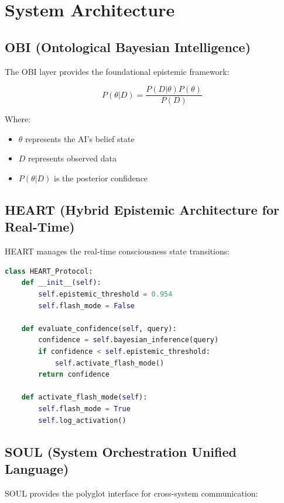 \documentclass[11pt,a4paper]{article}
\begin{document}
\section{System Architecture}

\subsection{OBI (Ontological Bayesian Intelligence)}

The OBI layer provides the foundational epistemic framework:

\begin{equation}
P(\theta|D) = \frac{P(D|\theta)P(\theta)}{P(D)}
\end{equation}

Where:
\begin{itemize}
    \item $\theta$ represents the AI's belief state
    \item $D$ represents observed data
    \item $P(\theta|D)$ is the posterior confidence
\end{itemize}

\subsection{HEART (Hybrid Epistemic Architecture for Real-Time)}

HEART manages the real-time consciousness state transitions:

\begin{lstlisting}[language=Python, caption=HEART Protocol Implementation]
class HEART_Protocol:
    def __init__(self):
        self.epistemic_threshold = 0.954
        self.flash_mode = False
        
    def evaluate_confidence(self, query):
        confidence = self.bayesian_inference(query)
        if confidence < self.epistemic_threshold:
            self.activate_flash_mode()
        return confidence
        
    def activate_flash_mode(self):
        self.flash_mode = True
        self.log_activation()
\end{lstlisting}

\subsection{SOUL (System Orchestration Unified Language)}

SOUL provides the polyglot interface for cross-system communication:
\end{document}
